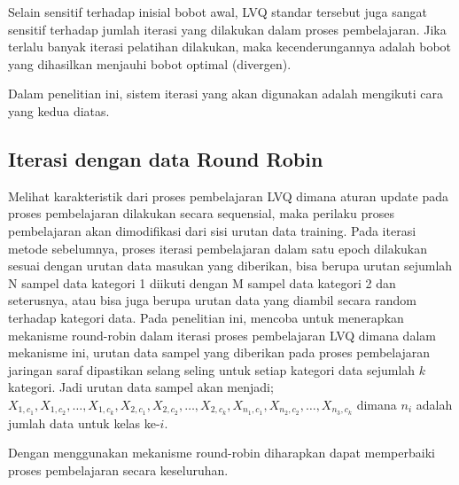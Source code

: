 Selain sensitif terhadap inisial bobot awal, LVQ standar tersebut juga sangat
sensitif terhadap jumlah iterasi yang dilakukan dalam proses pembelajaran. Jika
terlalu banyak iterasi pelatihan dilakukan, maka kecenderungannya adalah bobot
yang dihasilkan menjauhi bobot optimal (divergen)\cite{Sato:1995}.

\noindent Dalam penelitian ini, sistem iterasi yang akan digunakan adalah
mengikuti cara yang kedua diatas.
% 
% 
\subsection{Iterasi dengan data Round Robin}
\label{ssec:round-robin}
Melihat karakteristik dari proses pembelajaran LVQ dimana aturan update pada
proses pembelajaran dilakukan secara sequensial, maka perilaku proses
pembelajaran akan dimodifikasi dari sisi urutan data training. Pada iterasi metode sebelumnya,
proses iterasi pembelajaran dalam satu epoch dilakukan sesuai  dengan urutan
data masukan yang diberikan, bisa berupa urutan sejumlah N sampel data kategori
1 diikuti dengan  M sampel data kategori 2 dan seterusnya, atau bisa juga berupa
urutan data yang diambil secara random terhadap kategori data. Pada penelitian ini, \saya
mencoba untuk menerapkan mekanisme round-robin dalam iterasi proses pembelajaran
LVQ dimana dalam mekanisme ini, urutan data sampel yang diberikan pada proses
pembelajaran jaringan saraf dipastikan selang seling untuk setiap kategori data
sejumlah $k$ kategori. Jadi urutan data sampel akan menjadi; $X_{1,c_1},
X_{1,c_2}, \dots, X_{1,c_k}, X_{2,c_1}, X_{2,c_2}, \dots, X_{2,c_k},
X_{n_1,c_1},X_{n_2,c_2}, \dots,X_{n_3,c_k}$ dimana $n_i$ adalah jumlah data
untuk kelas ke-$i$.

Dengan menggunakan mekanisme round-robin diharapkan dapat memperbaiki proses
pembelajaran secara keseluruhan.


% 

